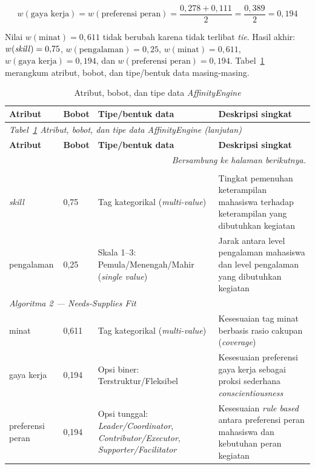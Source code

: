 \begin{equation*}
  w(\text{gaya kerja}) = w(\text{preferensi peran}) = \frac{0{,}278 + 0{,}111}{2} = \frac{0{,}389}{2} = 0{,}194
\end{equation*}

Nilai $w(\text{minat}) = 0{,}611$ tidak berubah karena tidak terlibat \emph{tie}. Hasil akhir: $w(\text{\emph{skill}}) = 0{,}75$, $w(\text{pengalaman}) = 0{,}25$, $w(\text{minat}) = 0{,}611$, $w(\text{gaya kerja}) = 0{,}194$, dan $w(\text{preferensi peran}) = 0{,}194$. Tabel~\ref{tab:atribut-bobot} merangkum atribut, bobot, dan tipe/bentuk data masing-masing.

\begin{longtable}{p{2.5cm} p{1.2cm} p{3.8cm} >{\raggedright\arraybackslash}p{\dimexpr\linewidth-7.5cm-8\tabcolsep\relax}}
  \caption{Atribut, bobot, dan tipe data \emph{AffinityEngine}}
  \label{tab:atribut-bobot} \\
  \toprule
    \textbf{Atribut} & \textbf{Bobot} & \textbf{Tipe/bentuk data} & \textbf{Deskripsi singkat} \\
  \midrule
  \endfirsthead
  \multicolumn{4}{l}{\small\textit{Tabel~\ref{tab:atribut-bobot} Atribut, bobot, dan tipe data \emph{AffinityEngine} (lanjutan)}} \\
  \toprule
    \textbf{Atribut} & \textbf{Bobot} & \textbf{Tipe/bentuk data} & \textbf{Deskripsi singkat} \\
  \midrule
  \endhead
  \bottomrule
  \multicolumn{4}{r}{\textit{Bersambung ke halaman berikutnya.}} \\
  \endfoot
  \bottomrule
  \endlastfoot
    \multicolumn{4}{l}{\textit{Algoritma 1 --- \emph{Demands-Abilities Fit}}} \\
    \midrule
    \emph{skill} & 0,75 & Tag kategorikal (\emph{multi-value}) & Tingkat pemenuhan keterampilan mahasiswa terhadap keterampilan yang dibutuhkan kegiatan \\
    \midrule
    pengalaman & 0,25 & Skala 1--3: Pemula/Menengah/Mahir (\emph{single value}) & Jarak antara level pengalaman mahasiswa dan level pengalaman yang dibutuhkan kegiatan \\
    \midrule
    \multicolumn{4}{l}{\textit{Algoritma 2 --- \emph{Needs-Supplies Fit}}} \\
    \midrule
    minat & 0,611 & Tag kategorikal (\emph{multi-value}) & Kesesuaian tag minat berbasis rasio cakupan (\emph{coverage}) \\
    \midrule
    gaya kerja & 0,194 & Opsi biner: Terstruktur/Fleksibel & Kesesuaian preferensi gaya kerja sebagai proksi sederhana \emph{conscientiousness} \\
    \midrule
    preferensi peran & 0,194 & Opsi tunggal: \emph{Leader/Coordinator}, \emph{Contributor/Executor}, \emph{Supporter/Facilitator} & Kesesuaian \emph{rule based} antara preferensi peran mahasiswa dan kebutuhan peran kegiatan \\
\end{longtable}

